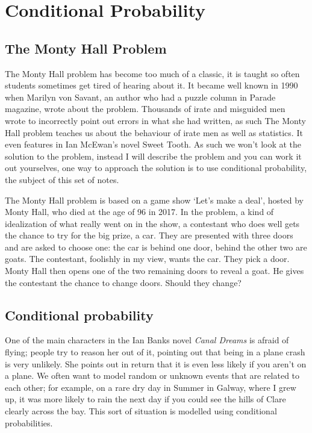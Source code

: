 \documentclass[11pt,a4paper]{scrartcl}
\begin{document}
\section*{Conditional Probability}

\subsection*{The Monty Hall Problem}

The Monty Hall problem has become too much of a classic, it is taught
so often students sometimes get tired of hearing about it. It became
well known in 1990 when Marilyn von Savant, an author who had a puzzle
column in Parade magazine, wrote about the problem. Thousands of irate
and misguided men wrote to incorrectly point out errors in what she
had written, as such  The Monty Hall problem teaches us about the
behaviour of irate men as well as statistics. It even features in Ian
McEwan's novel Sweet Tooth. As such we won't look at the solution to
the problem, instead I will describe the problem and you can work it
out yourselves, one way to approach the solution is to use conditional
probability, the subject of this set of notes.

The Monty Hall problem is based on a game show \lq{}Let's make a
deal\rq{}, hosted by Monty Hall, who died at the age of 96 in 2017. In
the problem, a kind of idealization of what really went on in the
show, a contestant who does well gets the chance to try for the big
prize, a car. They are presented with three doors and are asked to
choose one: the car is behind one door, behind the other two are
goats. The contestant, foolishly in my view, wants the car. They pick
a door. Monty Hall then opens one of the two remaining doors to reveal
a goat. He gives the contestant the chance to change doors. Should
they change?

\subsection*{Conditional probability}

One of the main characters in the Ian Banks novel \textit{Canal
  Dreams} is afraid of flying; people try to reason her out of it,
pointing out that being in a plane crash is very unlikely. She points
out in return that it is even less likely if you aren't on a plane. We
often want to model random or unknown events that are related to each
other; for example, on a rare dry day in Summer in Galway, where I
grew up, it was more likely to rain the next day if you could see the
hills of Clare clearly across the bay. This sort of situation is
modelled using conditional probabilities.
\end{document}
